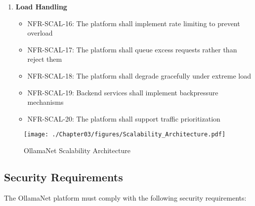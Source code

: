 \begin{enumerate}
   \item \textbf{Load Handling}
   \begin{itemize}
      \item NFR-SCAL-16: The platform shall implement rate limiting to prevent overload
      \item NFR-SCAL-17: The platform shall queue excess requests rather than reject them
      \item NFR-SCAL-18: The platform shall degrade gracefully under extreme load
      \item NFR-SCAL-19: Backend services shall implement backpressure mechanisms
      \item NFR-SCAL-20: The platform shall support traffic prioritization
   \end{itemize}
\end{enumerate}

\begin{sidewaysfigure}[p]
    \centering
    \texttt{[image: ./Chapter03/figures/Scalability\_Architecture.pdf]}
    \caption{OllamaNet Scalability Architecture}
    \label{fig:scalability-architecture}
\end{sidewaysfigure}
\clearpage

\subsection{Security Requirements}

The OllamaNet platform must comply with the following security requirements:

